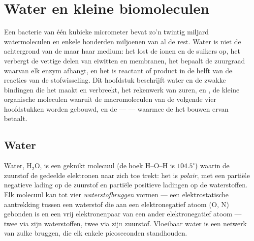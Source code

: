 \chapter{Water en kleine biomoleculen}\label{ch:b1:water-small-molecules}

Een bacterie van één kubieke micrometer bevat zo'n twintig miljard
watermoleculen en enkele honderden miljoenen van al de rest. Water is niet de
achtergrond van de  maar haar medium: het lost de ionen en de suikers op, het
verbergt de vettige delen van eiwitten en membranen, het bepaalt de zuurgraad
waarvan elk enzym afhangt, en het is reactant of product in de helft van de
reacties van de stofwisseling. Dit hoofdstuk beschrijft water en de zwakke
bindingen die het maakt en verbreekt, het rekenwerk van zuren,  en ,
de kleine organische moleculen waaruit de macromoleculen van de volgende vier
hoofdstukken worden gebouwd, en de  ---  --- waarmee de  het
bouwen ervan betaalt.

\section{Water}

\begin{definition}\label{def:b1:water-small-molecules:water}
Water, $\mathrm{H_2O}$, is een geknikt molecuul (de hoek H--O--H is
$104.5^\circ$) waarin de zuurstof de gedeelde elektronen naar zich toe trekt:
het is \emph{polair}, met een partiële negatieve lading op
de zuurstof en partiële positieve ladingen op de waterstoffen. Elk molecuul kan
tot vier \emph{waterstofbruggen} vormen --- een
elektrostatische aantrekking tussen een waterstof die aan een elektronegatief atoom
(O, N) gebonden is en een vrij elektronenpaar van een ander elektronegatief atoom
--- twee via zijn waterstoffen, twee via zijn zuurstof. Vloeibaar water is een
netwerk van zulke bruggen, die elk enkele picoseconden standhouden.
\end{definition}

